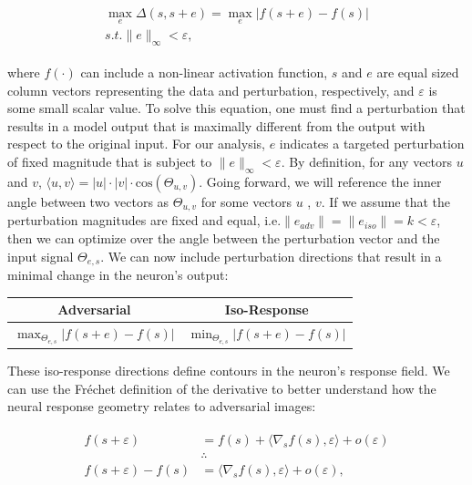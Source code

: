 \begin{align}\label{eq:ch4_adv_metric}
\begin{split}
    \max_{e} \Delta (s, s+e) = \max_{e} |f(s+e) - f(s)| \\
    s.t. \|e\|_{\infty} < \varepsilon,
\end{split}
\end{align}

where $f(\cdot)$ can include a non-linear activation function, $s$ and $e$ are equal sized column vectors representing the data and perturbation, respectively, and $\varepsilon$ is some small scalar value.
To solve this equation, one must find a perturbation that results in a model output that is maximally different from the output with respect to the original input.
For our analysis, $e$ indicates a targeted perturbation of fixed magnitude that is subject to $\|e\|_{\infty}<\varepsilon$.
By definition, for any vectors $u$ and $v$, $\langle u,v\rangle = |u| \cdot |v| \cdot \mathrm{cos}(\Theta_{u,v})$.
Going forward, we will reference the inner angle between two vectors as $\Theta_{u,v}$ for some vectors $u$ , $v$.
If we assume that the perturbation magnitudes are fixed and equal, i.e.$\|e_{adv}\| = \|e_{iso}\| = k < \varepsilon$, then we can optimize over the angle between the perturbation vector and the input signal $\Theta_{e,s}$.
We can now include perturbation directions that result in a minimal change in the neuron's output:

\begin{center}
    \begin{tabular}{ |c | c| } \hline
     \textbf{Adversarial} & \textbf{Iso-Response} \\ \hline
     $\max_{\Theta_{e,s}}|f(s+e) - f(s)|$ & $\min_{\Theta_{e,s}} | f(s+e) - f(s) |$ \\ \hline
    \end{tabular}
\end{center}

These iso-response directions define contours in the neuron's response field.
We can use the Fr\'{e}chet definition of the derivative to better understand how the neural response geometry relates to adversarial images:

\begin{align}\label{eq:ch4_frechet}
\begin{split}
    f(s+\varepsilon) &= f(s) + \langle\nabla_{s}f(s), \varepsilon\rangle + o(\varepsilon)\\
    &\therefore \\
    f(s+\varepsilon) - f(s) &= \langle\nabla_{s}f(s), \varepsilon\rangle+ o(\varepsilon),
\end{split}
\end{align}

